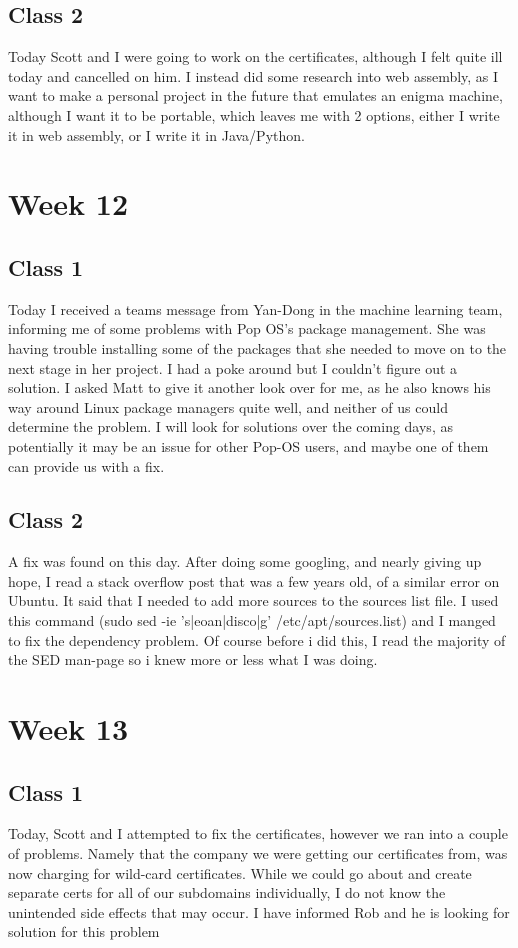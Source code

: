 \documentclass{article}
\begin{document}
\subsection{Class 2}
Today Scott and I were going to work on the certificates, although I felt quite ill today and cancelled on him. I instead did some research into web assembly, as I 
want to make a personal project in the future that emulates an enigma machine, although I want it to be portable, which leaves me with 2 options, either I write
it in web assembly, or I write it in Java/Python. 

\section{Week 12}
\subsection{Class 1}
Today I received a teams message from Yan-Dong in the machine learning team, informing me of some problems with Pop OS's package management. She was having trouble 
installing some of the packages that she needed to move on to the next stage in her project. I had a poke around but I couldn't figure out a solution. I asked Matt
to give it another look over for me, as he also knows his way around Linux package managers quite well, and neither of us could determine the problem. I will look
for solutions over the coming days, as potentially it may be an issue for other Pop-OS users, and maybe one of them can provide us with a fix.

\subsection{Class 2}
A fix was found on this day. After doing some googling, and nearly giving up hope, I read a stack overflow post that was a few years old, of a similar error on
Ubuntu. It said that I needed to add more sources to the sources list file. I used this command (sudo sed -ie 's|eoan|disco|g' /etc/apt/sources.list) and I manged to
fix the dependency problem. Of course before i did this, I read the majority of the SED man-page so i knew more or less what I was doing.

\section{Week 13}
\subsection{Class 1}
Today, Scott and I attempted to fix the certificates, however we ran into a couple of problems. Namely that the company we were getting our certificates from, 
was now charging for wild-card certificates. While we could go about and create separate certs for all of our subdomains individually, I do not know the unintended
side effects that may occur. I have informed Rob and he is looking for solution for this problem
\end{document}
